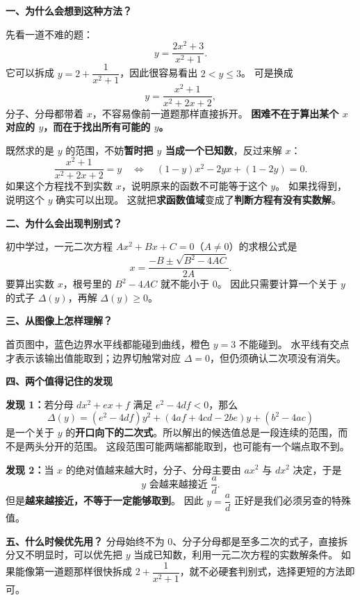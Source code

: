 \clearpage
\begin{explanationbox}
  \textbf{\textcolor{CExplanation}{一、为什么会想到这种方法？}}

  \medskip
  先看一道不难的题：
  \[
    y=\frac{2x^2+3}{x^2+1}.
  \]
  它可以拆成 $y=2+\dfrac1{x^2+1}$，因此很容易看出 $2<y\le3$。
  可是换成
  \[
    y=\frac{x^2+1}{x^2+2x+2},
  \]
  分子、分母都带着 $x$，不容易像前一道题那样直接拆开。
  \textbf{困难不在于算出某个 $x$ 对应的 $y$，而在于找出所有可能的 $y$。}

  \medskip
  既然求的是 $y$ 的范围，不妨\textbf{暂时把 $y$ 当成一个已知数}，反过来解 $x$：
  \[
    \frac{x^2+1}{x^2+2x+2}=y
    \quad\Longleftrightarrow\quad
    (1-y)x^2-2yx+(1-2y)=0.
  \]
  如果这个方程找不到实数 $x$，说明原来的函数不可能等于这个 $y$。
  如果找得到，说明这个 $y$ 确实可以出现。
  这就把\textbf{求函数值域}变成了\textbf{判断方程有没有实数解}。

  \medskip
  \textbf{\textcolor{CExplanation}{二、为什么会出现判别式？}}

  \medskip
  初中学过，一元二次方程 $Ax^2+Bx+C=0$（$A\ne0$）的求根公式是
  \[
    x=\frac{-B\pm\sqrt{B^2-4AC}}{2A}.
  \]
  要算出实数 $x$，根号里的 $B^2-4AC$ 就不能小于 $0$。
  因此只需要计算一个关于 $y$ 的式子 $\Delta(y)$，再解 $\Delta(y)\ge0$。

  \medskip
  \textbf{\textcolor{CExplanation}{三、从图像上怎样理解？}}

  \medskip
  首页图中，蓝色边界水平线都能碰到曲线，橙色 $y=3$ 不能碰到。
水平线有交点才表示该输出值能取到；边界切触常对应 $\Delta=0$，但仍须确认二次项没有消失。

  \medskip
  \textbf{\textcolor{CExplanation}{四、两个值得记住的发现}}

  \medskip
  \textbf{发现 1：}若分母 $dx^2+ex+f$ 满足 $e^2-4df<0$，那么
  \[
    \Delta(y)=(e^2-4df)y^2+(4af+4cd-2be)y+(b^2-4ac)
  \]
  是一个关于 $y$ 的\textbf{开口向下的二次式}。所以解出的候选值总是一段连续的范围，而不是两头分开的范围。
  这段范围可能两端都能取到，也可能有一个端点取不到。

  \medskip
  \textbf{发现 2：}当 $x$ 的绝对值越来越大时，分子、分母主要由 $ax^2$ 与 $dx^2$ 决定，于是
  \[
    y\text{ 会越来越接近 }\frac ad.
  \]
  但是\textbf{越来越接近，不等于一定能够取到}。
  因此 $y=\dfrac ad$ 正好是我们必须另查的特殊值。

  \medskip
  \textbf{\textcolor{CExplanation}{五、什么时候优先用？}}
  分母始终不为 $0$、分子分母都是至多二次的式子，直接拆分又不明显时，可以优先把 $y$ 当成已知数，利用一元二次方程的实数解条件。
  如果能像第一道题那样很快拆成 $2+\dfrac1{x^2+1}$，就不必硬套判别式，选择更短的方法即可。



\end{explanationbox}
